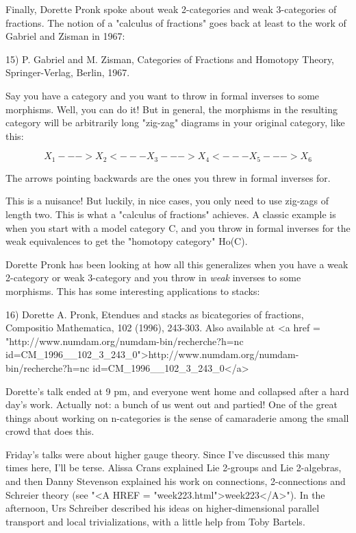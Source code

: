 Finally, Dorette Pronk spoke about weak 2-categories and weak
3-categories of fractions.  The notion of a "calculus of
fractions" goes back at least to the work of Gabriel and Zisman
in 1967:

15) P. Gabriel and M. Zisman, Categories of Fractions and Homotopy 
Theory, Springer-Verlag, Berlin, 1967.

Say you have a category and you want to throw in formal inverses to 
some morphisms.  Well, you can do it!  But in general, the morphisms 
in the resulting category will be arbitrarily long "zig-zag" 
diagrams in your original category, like this:


$$

X_{1} ---> X_{2} <--- X_{3} ---> X_{4} <--- X_{5} ---> X_{6}
$$
    
The arrows pointing backwards are the ones you threw in formal 
inverses for.  

This is a nuisance!  But luckily, in nice cases, you only need to use
zig-zags of length two.  This is what a "calculus of
fractions" achieves.  A classic example is when you start with a
model category C, and you throw in formal inverses for the weak
equivalences to get the "homotopy category" Ho(C).

Dorette Pronk has been looking at how all this generalizes when
you have a weak 2-category or weak 3-category and you throw in 
\emph{weak} inverses to some morphisms.  This has some interesting 
applications to stacks:

16) Dorette A. Pronk, Etendues and stacks as bicategories of 
fractions, Compositio Mathematica, 102 (1996), 243-303.  Also
available at <a href = "http://www.numdam.org/numdam-bin/recherche?h=nc\text{\&} id=CM_1996__102_3_243_0">http://www.numdam.org/numdam-bin/recherche?h=nc\text{\&} id=CM_1996__102_3_243_0</a>

Dorette's talk ended at 9 pm, and everyone went home and collapsed
after a hard day's work.  Actually not: a bunch of us went out and
partied!  One of the great things about working on n-categories is
the sense of camaraderie among the small crowd that does this.

Friday's talks were about higher gauge theory.  Since I've discussed
this many times here, I'll be terse.  Alissa Crans explained Lie 
2-groups and Lie 2-algebras, and then Danny Stevenson explained his 
work on connections, 2-connections and Schreier theory (see 
"<A HREF = "week223.html">week223</A>").  In the afternoon, Urs Schreiber described his ideas 
on higher-dimensional parallel transport and local trivializations,
with a little help from Toby Bartels.

